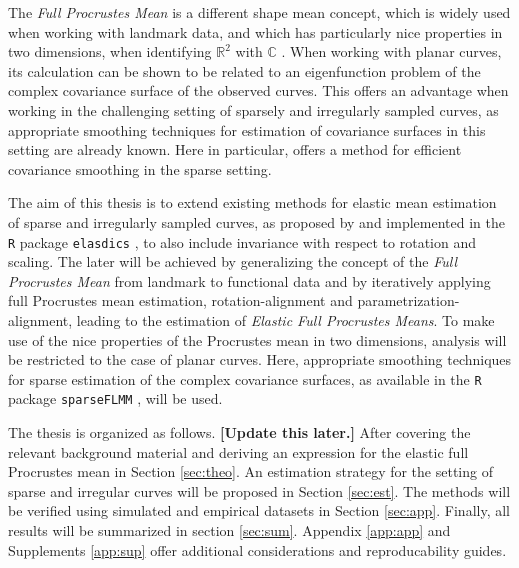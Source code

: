 The \textit{Full Procrustes Mean} is a different shape mean concept, which is widely used when working with landmark data, and which has particularly nice properties in two dimensions, when identifying $\mathbb{R}^2$ with $\mathbb{C}$ \parencite[see][Chap.\ 8]{DrydenMardia2016}.
When working with planar curves, its calculation can be shown to be related to an eigenfunction problem of the complex covariance surface of the observed curves.
This offers an advantage when working in the challenging setting of sparsely and irregularly sampled curves, as appropriate smoothing techniques for estimation of covariance surfaces in this setting are already known.
Here in particular, \cite{CederbaumScheiplGreven2018} offers a method for efficient covariance smoothing in the sparse setting. 

The aim of this thesis is to extend existing methods for elastic mean estimation of sparse and irregularly sampled curves, as proposed by \cite{Steyer2021} and implemented in the \texttt{R} package \texttt{elasdics} \parencite{elasdics}, to also include invariance with respect to rotation and scaling.
The later will be achieved by generalizing the concept of the \textit{Full Procrustes Mean} from landmark to functional data and by iteratively applying full Procrustes mean estimation, rotation-alignment and parametrization-alignment, leading to the estimation of \textit{Elastic Full Procrustes Means}.
To make use of the nice properties of the Procrustes mean in two dimensions, analysis will be restricted to the case of planar curves.
Here, appropriate smoothing techniques for sparse estimation of the complex covariance surfaces, as available in the \texttt{R} package \texttt{sparseFLMM} \parencite{sparseFLMM}, will be used.

The thesis is organized as follows. 
\textbf{[Update this later.]}
After covering the relevant background material and deriving an expression for the elastic full Procrustes mean in Section \ref{sec:theo}.
An estimation strategy for the setting of sparse and irregular curves will be proposed in Section \ref{sec:est}.
The methods will be verified using simulated and empirical datasets in Section \ref{sec:app}.
Finally, all results will be summarized in section \ref{sec:sum}.
Appendix \ref{app:app} and Supplements \ref{app:sup} offer additional considerations and reproducability guides.

\newpage
